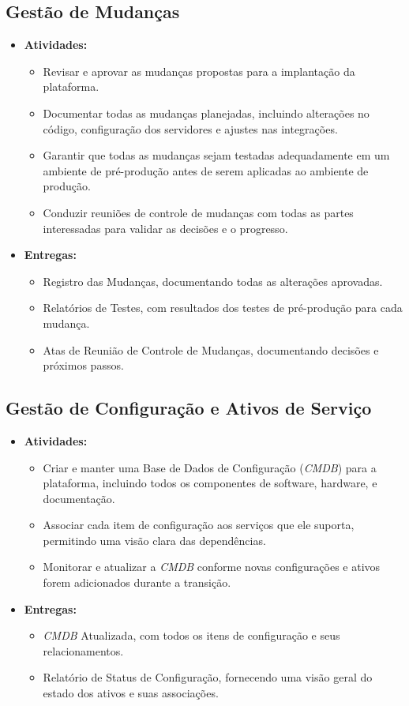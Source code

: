 \documentclass{article}
\begin{document}
\subsection{Gestão de Mudanças}
\begin{itemize}
    \item \textbf{Atividades:}
    \begin{itemize}
        \item Revisar e aprovar as mudanças propostas para a implantação da plataforma.
        \item Documentar todas as mudanças planejadas, incluindo alterações no código, configuração dos servidores e ajustes nas integrações.
        \item Garantir que todas as mudanças sejam testadas adequadamente em um ambiente de pré-produção antes de serem aplicadas ao ambiente de produção.
        \item Conduzir reuniões de controle de mudanças com todas as partes interessadas para validar as decisões e o progresso.
    \end{itemize}
    \item \textbf{Entregas:}
    \begin{itemize}
        \item Registro das Mudanças, documentando todas as alterações aprovadas.
        \item Relatórios de Testes, com resultados dos testes de pré-produção para cada mudança.
        \item Atas de Reunião de Controle de Mudanças, documentando decisões e próximos passos.
    \end{itemize}
\end{itemize}

\subsection{Gestão de Configuração e Ativos de Serviço}
\begin{itemize}
    \item \textbf{Atividades:}
    \begin{itemize}
        \item Criar e manter uma Base de Dados de Configuração (\textit{CMDB}) para a plataforma, incluindo todos os componentes de software, hardware, e documentação.
        \item Associar cada item de configuração aos serviços que ele suporta, permitindo uma visão clara das dependências.
        \item Monitorar e atualizar a \textit{CMDB} conforme novas configurações e ativos forem adicionados durante a transição.
    \end{itemize}
    \item \textbf{Entregas:}
    \begin{itemize}
        \item \textit{CMDB} Atualizada, com todos os itens de configuração e seus relacionamentos.
        \item Relatório de Status de Configuração, fornecendo uma visão geral do estado dos ativos e suas associações.
    \end{itemize}
\end{itemize}
\end{document}
